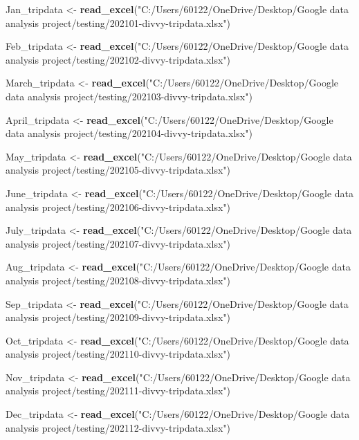 \documentclass[
]{article}
\newenvironment{Shaded}{\begin{snugshade}}{\end{snugshade}}
\newcommand{\FunctionTok}[1]{\textcolor[rgb]{0.13,0.29,0.53}{\textbf{#1}}}
\newcommand{\NormalTok}[1]{#1}
\newcommand{\OtherTok}[1]{\textcolor[rgb]{0.56,0.35,0.01}{#1}}
\newcommand{\StringTok}[1]{\textcolor[rgb]{0.31,0.60,0.02}{#1}}
\begin{document}
\begin{Shaded}
\begin{Highlighting}[]
\NormalTok{Jan\_tripdata }\OtherTok{\textless{}{-}} \FunctionTok{read\_excel}\NormalTok{(}\StringTok{"C:/Users/60122/OneDrive/Desktop/Google data analysis project/testing/202101{-}divvy{-}tripdata.xlsx"}\NormalTok{)}

\NormalTok{Feb\_tripdata }\OtherTok{\textless{}{-}} \FunctionTok{read\_excel}\NormalTok{(}\StringTok{"C:/Users/60122/OneDrive/Desktop/Google data analysis project/testing/202102{-}divvy{-}tripdata.xlsx"}\NormalTok{)}

\NormalTok{March\_tripdata }\OtherTok{\textless{}{-}} \FunctionTok{read\_excel}\NormalTok{(}\StringTok{"C:/Users/60122/OneDrive/Desktop/Google data analysis project/testing/202103{-}divvy{-}tripdata.xlsx"}\NormalTok{)}

\NormalTok{April\_tripdata }\OtherTok{\textless{}{-}} \FunctionTok{read\_excel}\NormalTok{(}\StringTok{"C:/Users/60122/OneDrive/Desktop/Google data analysis project/testing/202104{-}divvy{-}tripdata.xlsx"}\NormalTok{)}

\NormalTok{May\_tripdata }\OtherTok{\textless{}{-}} \FunctionTok{read\_excel}\NormalTok{(}\StringTok{"C:/Users/60122/OneDrive/Desktop/Google data analysis project/testing/202105{-}divvy{-}tripdata.xlsx"}\NormalTok{)}

\NormalTok{June\_tripdata }\OtherTok{\textless{}{-}} \FunctionTok{read\_excel}\NormalTok{(}\StringTok{"C:/Users/60122/OneDrive/Desktop/Google data analysis project/testing/202106{-}divvy{-}tripdata.xlsx"}\NormalTok{)}

\NormalTok{July\_tripdata }\OtherTok{\textless{}{-}} \FunctionTok{read\_excel}\NormalTok{(}\StringTok{"C:/Users/60122/OneDrive/Desktop/Google data analysis project/testing/202107{-}divvy{-}tripdata.xlsx"}\NormalTok{)}

\NormalTok{Aug\_tripdata }\OtherTok{\textless{}{-}} \FunctionTok{read\_excel}\NormalTok{(}\StringTok{"C:/Users/60122/OneDrive/Desktop/Google data analysis project/testing/202108{-}divvy{-}tripdata.xlsx"}\NormalTok{)}

\NormalTok{Sep\_tripdata }\OtherTok{\textless{}{-}} \FunctionTok{read\_excel}\NormalTok{(}\StringTok{"C:/Users/60122/OneDrive/Desktop/Google data analysis project/testing/202109{-}divvy{-}tripdata.xlsx"}\NormalTok{)}

\NormalTok{Oct\_tripdata }\OtherTok{\textless{}{-}} \FunctionTok{read\_excel}\NormalTok{(}\StringTok{"C:/Users/60122/OneDrive/Desktop/Google data analysis project/testing/202110{-}divvy{-}tripdata.xlsx"}\NormalTok{)}

\NormalTok{Nov\_tripdata }\OtherTok{\textless{}{-}} \FunctionTok{read\_excel}\NormalTok{(}\StringTok{"C:/Users/60122/OneDrive/Desktop/Google data analysis project/testing/202111{-}divvy{-}tripdata.xlsx"}\NormalTok{)}

\NormalTok{Dec\_tripdata }\OtherTok{\textless{}{-}} \FunctionTok{read\_excel}\NormalTok{(}\StringTok{"C:/Users/60122/OneDrive/Desktop/Google data analysis project/testing/202112{-}divvy{-}tripdata.xlsx"}\NormalTok{)}
\end{Highlighting}
\end{Shaded}
\end{document}
